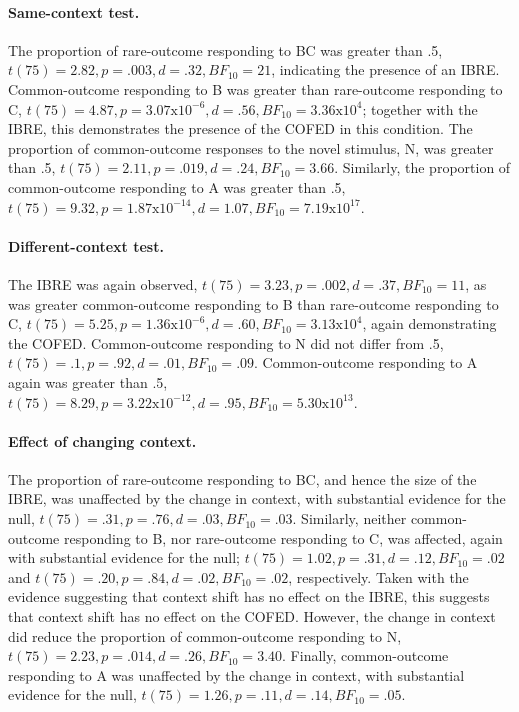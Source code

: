 \documentclass[twocolumn]{article}
\begin{document}
{\paragraph{Same-context  test.} The proportion of rare-outcome responding to BC was greater than .5, $t(75) = 2.82, p = .003, d = .32, BF_{10} = 21$, indicating the presence of an IBRE. Common-outcome responding to B was greater than rare-outcome responding to C, $t(75) = 4.87, p = 3.07 \text{x} 10^{-6}, d = .56, BF_{10} = 3.36 \text{x} 10^{4}$; together with the IBRE, this demonstrates the presence of the COFED in this condition. The proportion of common-outcome responses to the novel stimulus, N, was greater than .5, $t(75) = 2.11, p = .019, d = .24, BF_{10} = 3.66$. Similarly, the proportion of common-outcome responding to A was greater than .5, $t(75) = 9.32, p = 1.87 \text{x} 10^{-14}, d = 1.07, BF_{10} = 7.19 \text{x} 10^{17}$.

\paragraph{Different-context test.} The IBRE was again observed, $t(75) = 3.23, p = .002, d = .37, BF_{10} = 11$, as was greater common-outcome responding to B than rare-outcome responding to C, $t(75) = 5.25, p = 1.36 \text{x} 10^{-6}, d = .60, BF_{10} = 3.13 \text{x} 10^{4}$, again demonstrating the COFED. Common-outcome responding to N did not differ from .5, $t(75) = .1, p = .92, d = .01, BF_{10} = .09$. Common-outcome responding to A again was greater than .5, $t(75) = 8.29, p = 3.22 \text{x} 10^{-12}, d = .95, BF_{10} = 5.30 \text{x} 10^{13}$.

\paragraph{Effect of changing context.} The proportion of rare-outcome responding to BC, and hence the size of the IBRE, was unaffected by the change in context, with substantial evidence for the null, $t(75) = .31, p = .76, d = .03, BF_{10} = .03$. Similarly, neither common-outcome responding to B, nor rare-outcome responding to C, was affected, again with substantial evidence for the null; $t(75) = 1.02, p = .31, d = .12, BF_{10} = .02$ and $t(75) = .20, p = .84, d = .02, BF_{10} = .02$, respectively. Taken with the evidence suggesting that context shift has no effect on the IBRE, this suggests that context shift has no effect on the COFED. However, the change in context did reduce the proportion of common-outcome responding to N, $t(75) = 2.23, p = .014, d = .26, BF_{10} = 3.40$. Finally, common-outcome responding to A was unaffected by the change in context, with substantial evidence for the null, $t(75) = 1.26, p = .11, d = .14, BF_{10} = .05$.

}
\end{document}
